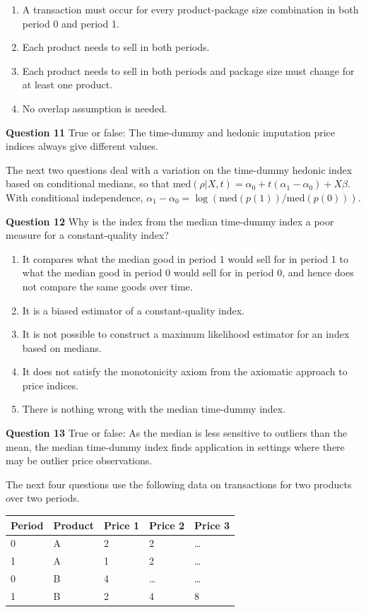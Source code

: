 \documentclass[
]{article}
\begin{document}
\begin{enumerate}
\def\labelenumi{\alph{enumi})}
\item
  A transaction must occur for every product-package size combination in both period 0 and period 1.
\item
  Each product needs to sell in both periods.
\item
  Each product needs to sell in both periods and package size must change for at least one product.
\item
  No overlap assumption is needed.
\end{enumerate}

\textbf{Question 11} True or false: The time-dummy and hedonic imputation price indices always give different values.

The next two questions deal with a variation on the time-dummy hedonic index based on conditional medians, so that \(\text{med}(\rho | X, t) = \alpha_{0} + t (\alpha_{1} - \alpha_{0}) + X \beta\). With conditional independence, \(\alpha_{1} - \alpha_{0} = \log(\text{med}(p(1)) / \text{med}(p(0)))\).

\textbf{Question 12} Why is the index from the median time-dummy index a poor measure for a constant-quality index?

\begin{enumerate}
\def\labelenumi{\alph{enumi})}
\item
  It compares what the median good in period 1 would sell for in period 1 to what the median good in period 0 would sell for in period 0, and hence does not compare the same goods over time.
\item
  It is a biased estimator of a constant-quality index.
\item
  It is not possible to construct a maximum likelihood estimator for an index based on medians.
\item
  It does not satisfy the monotonicity axiom from the axiomatic approach to price indices.
\item
  There is nothing wrong with the median time-dummy index.
\end{enumerate}

\textbf{Question 13} True or false: As the median is less sensitive to outliers than the mean, the median time-dummy index finds application in settings where there may be outlier price observations.

The next four questions use the following data on transactions for two products over two periods.

\begin{longtable}[]{@{}lllll@{}}
\toprule
Period & Product & Price 1 & Price 2 & Price 3 \\
\midrule
\endhead
0 & A & 2 & 2 & \ldots{} \\
1 & A & 1 & 2 & \ldots{} \\
0 & B & 4 & \ldots{} & \ldots{} \\
1 & B & 2 & 4 & 8 \\
\bottomrule
\end{longtable}
\end{document}
